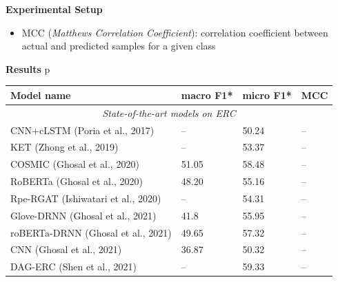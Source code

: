\documentclass[final,hyperref={pdfpagelabels=false},unknownkeysallowed]{beamer} %
\begin{document}
\begin{frame}
\begin{minipage}{0.475\textwidth}
\begin{block}{\textbf{Experimental Setup}}
\begin{itemize}
  \item\enspace \textcolor{lbmagenta}{MCC} (\textsl{Matthews Correlation Coefficient}): correlation coefficient between actual and predicted samples for a given class
\end{itemize}
\vspace{-1ex}
    \end{block}
\end{minipage}
\quad
\begin{minipage}{0.505\textwidth}
\newcommand{\mysp}{{\color{block body.bg}0}}
    \begin{block}{\textbf{Results} {\color{block title.bg}p}}
\begin{center}
    \begin{table}[!ht]
      \centering
      \begin{tabular}{@{}llll@{}}
      \toprule
      \textbf{Model name}                                        &\textbf{ macro F1*}    & \textbf{micro F1*}   &  \textbf{MCC} \\ \midrule
      \multicolumn{4}{c}{\textit{State-of-the-art models on ERC}}\\ \midrule
      CNN+cLSTM \textcolor{aclblue}{(Poria et al., 2017)}        & --                    & 50.24                & -- \\
      KET \textcolor{aclblue}{(Zhong et al., 2019)}                       & --                    & 53.37                & -- \\
      COSMIC \textcolor{aclblue}{(Ghosal et al., 2020)}                      & 51.05                 & 58.48                & -- \\
      RoBERTa \textcolor{aclblue}{(Ghosal et al., 2020)}                     & 48.20                 & 55.16                & -- \\
      Rpe-RGAT \textcolor{aclblue}{(Ishiwatari et al., 2020)}              & --                    & 54.31                & -- \\
      Glove-DRNN \textcolor{aclblue}{(Ghosal et al., 2021)}               & 41.8                  & 55.95                & -- \\
      roBERTa-DRNN \textcolor{aclblue}{(Ghosal et al., 2021)}             & 49.65                 & 57.32                & -- \\
      CNN \textcolor{aclblue}{(Ghosal et al., 2021)}                      & 36.87                 & 50.32                & -- \\
      DAG-ERC \textcolor{aclblue}{(Shen et al., 2021)}                     & --                    & 59.33                & -- \\

\end{tabular}
\end{table}
\end{center}
\end{block}
\end{minipage}
\end{frame}
\end{document}
